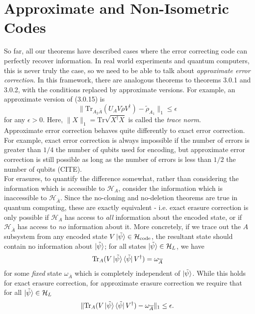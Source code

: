 \documentclass[12pt,a4paper]{report}
\numberwithin{equation}{section}
\newcommand{\ketbra}[2]{\ket{#1}\bra{#2}}
\newcommand{\ketbras}[1]{\ketbra{#1}{#1}}
\newcommand{\Hcode}{\mathcal{H}_{\text{code}}}
\newcommand{\ol}[1]{\overline{#1}}
\newcommand{\tr}{\text{Tr}}
\theoremstyle{definition}
\theoremstyle{theorem}
\theoremstyle{theorem}
\theoremstyle{example}
\theoremstyle{definition}
\begin{document}
\section{Approximate and Non-Isometric Codes}
So far, all our theorems have described cases where the error correcting code can perfectly recover information. In real world experiments and quantum computers, this is never truly the case, so we need to be able to talk about \textit{approximate error correction}. In this framework, there are analogous theorems to theorems 3.0.1 and 3.0.2, with the conditions replaced by approximate versions. For example, an approximate version of (3.0.15) is
\begin{equation}
	\lVert\tr_{A_{2}\ol{A}}(U_{A}V\tilde{\rho}V^{\dagger})-\tilde{\rho}_{A_{1}}\rVert_{1}\leq\epsilon
\end{equation}
for any $\epsilon>0$. Here, $\lVert X\rVert_{1}=\tr\sqrt{X^{\dagger}X}$ is called the \textit{trace norm}.\\
Approximate error correction behaves quite differently to exact error correction. For example, exact error correction is always impossible if the number of errors is greater than $1/4$ the number of qubits used for encoding, but approximate error correction is still possible as long as the number of errors is less than $1/2$ the number of qubits (CITE).\\
For erasures, to quantify the difference somewhat, rather than considering the information which is accessible to $\mathcal{H}_{A}$, consider the information which is inaccessible to $\mathcal{H}_{\ol{A}}$. Since the no-cloning and no-deletion theorems are true in quantum computing, these are exactly equivalent - i.e. exact erasure correction is only possible if $\mathcal{H}_{A}$ has access to \textit{all} information about the encoded state, or if $\mathcal{H}_{\ol{A}}$ has access to \textit{no} information about it. More concretely, if we trace out the $A$ subsystem from any encoded state $V\ket{\tilde{\psi}}\in\Hcode$, the resultant state should contain no information about $\ket{\tilde{\psi}}$; for all states $\ket{\tilde{\psi}}\in\mathcal{H}_{L}$, we have
\begin{equation}
	\tr_{A}(V\ketbras{\tilde{\psi}}V^{\dagger})=\omega_{\ol{A}}
\end{equation} 
for some \textit{fixed} state $\omega_{\ol{A}}$ which is completely independent of $\ket{\tilde{\psi}}$. While this holds for exact erasure correction, for approximate erasure correction we require that for all $\ket{\tilde{\psi}}\in\mathcal{H}_{L}$
\begin{equation}
	\lVert \tr_{A}(V\ketbras{\tilde{\psi}}V^{\dagger})-\omega_{\ol{A}}\rVert_{1}\leq \epsilon.
\end{equation}
\end{document}
